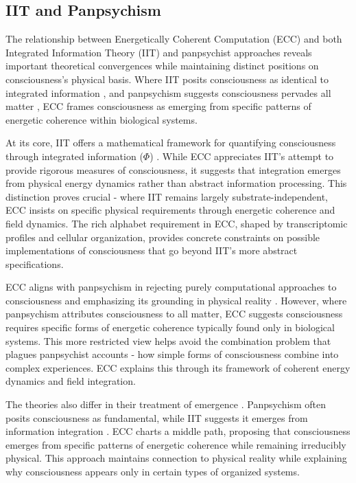 \begin{refsection}
\section{IIT and Panpsychism}


The relationship between Energetically Coherent Computation (ECC) and both Integrated Information Theory (IIT) and panpsychist approaches reveals important theoretical convergences while maintaining distinct positions on consciousness's physical basis. Where IIT posits consciousness as identical to integrated information \cite{Tononi2008}, and panpsychism suggests consciousness pervades all matter \cite{Strawson2006}, ECC frames consciousness as emerging from specific patterns of energetic coherence within biological systems.

At its core, IIT offers a mathematical framework for quantifying consciousness through integrated information ($\Phi$) \cite{Tononi2016}. While ECC appreciates IIT's attempt to provide rigorous measures of consciousness, it suggests that integration emerges from physical energy dynamics rather than abstract information processing. This distinction proves crucial - where IIT remains largely substrate-independent, ECC insists on specific physical requirements through energetic coherence and field dynamics. The rich alphabet requirement in ECC, shaped by transcriptomic profiles and cellular organization, provides concrete constraints on possible implementations of consciousness that go beyond IIT's more abstract specifications.

ECC aligns with panpsychism in rejecting purely computational approaches to consciousness and emphasizing its grounding in physical reality \cite{Nagel1979}. However, where panpsychism attributes consciousness to all matter, ECC suggests consciousness requires specific forms of energetic coherence typically found only in biological systems. This more restricted view helps avoid the combination problem that plagues panpsychist accounts \cite{Chalmers2015} - how simple forms of consciousness combine into complex experiences. ECC explains this through its framework of coherent energy dynamics and field integration.

The theories also differ in their treatment of emergence \cite{Goff2019}. Panpsychism often posits consciousness as fundamental, while IIT suggests it emerges from information integration \cite{Oizumi2014}. ECC charts a middle path, proposing that consciousness emerges from specific patterns of energetic coherence while remaining irreducibly physical. This approach maintains connection to physical reality while explaining why consciousness appears only in certain types of organized systems.


\end{refsection}
